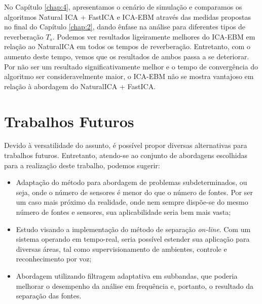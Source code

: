 No Capítulo \ref{chap:4}, apresentamos o cenário de simulação e comparamos os algoritmos Natural ICA + FastICA e ICA-EBM através das medidas propostas no final do Capítulo \ref{chap:2}, dando ênfase na análise para diferentes tipos de reverberação ${T_s}$. Podemos ver resultados ligeiramente melhores do ICA-EBM em relação ao NaturalICA em todos os tempos de reverberação. Entretanto, com o aumento deste tempo, vemos que os resultados de ambos passa a se deteriorar. Por não ser um resultado significativamente melhor e o tempo de convergência do algoritmo ser consideravelmente maior, o ICA-EBM não se mostra vantajoso em relação à abordagem do NaturalICA + FastICA.

\section{Trabalhos Futuros}

Devido à versatilidade do assunto, é possível propor diversas alternativas para trabalhos futuros. Entretanto, atendo-se ao conjunto de abordagens escolhidas para a realização deste trabalho, podemos sugerir:
\begin{itemize}
    \item Adaptação do método para abordagem de problemas subdeterminados, ou seja, onde o número de sensores é menor do que o número de fontes. Por ser um caso mais próximo da realidade, onde nem sempre dispõe-se do mesmo número de fontes e sensores, sua aplicabilidade seria bem mais vasta;
    
    \item Estudo visando a implementação do método de separação \textit{on-line}. Com um sistema operando em tempo-real, seria possível estender sua aplicação para diversas áreas, tal como supervisionamento de ambientes, controle e reconhecimento por voz;
    
    \item Abordagem utilizando filtragem adaptativa em subbandas, que poderia melhorar o desempenho da análise em frequência e, portanto, o resultado da separação das fontes.
\end{itemize}